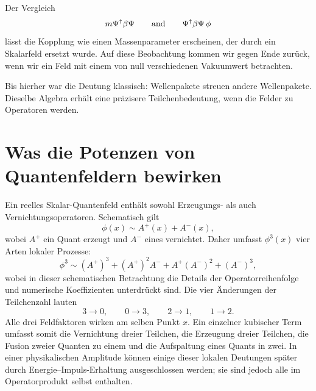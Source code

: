 \begin{classroomqa}
\end{classroomqa}

Der Vergleich
\begin{equation}
m\Psi^\dagger\beta\Psi
\qquad\hbox{and}\qquad
\Psi^\dagger\beta\Psi\,\phi
\end{equation}
lässt die Kopplung wie einen Massenparameter erscheinen, der durch ein Skalarfeld ersetzt wurde. Auf diese Beobachtung kommen wir gegen Ende zurück, wenn wir ein Feld mit einem von null verschiedenen Vakuumwert betrachten.

Bis hierher war die Deutung klassisch: Wellenpakete streuen andere Wellenpakete. Dieselbe Algebra erhält eine präzisere Teilchenbedeutung, wenn die Felder zu Operatoren werden.

\section{Was die Potenzen von Quantenfeldern bewirken}

Ein reelles Skalar-Quantenfeld enthält sowohl Erzeugungs- als auch Vernichtungsoperatoren. Schematisch gilt
\begin{equation}
\phi(x)\sim A^+(x)+A^-(x),
\end{equation}
wobei \(A^+\) ein Quant erzeugt und \(A^-\) eines vernichtet. Daher umfasst \(\phi^3(x)\) vier Arten lokaler Prozesse:
\begin{equation}
\phi^3
\sim
(A^+)^3+(A^+)^2A^-+A^+(A^-)^2+(A^-)^3,
\end{equation}
wobei in dieser schematischen Betrachtung die Details der Operatorreihenfolge und numerische Koeffizienten unterdrückt sind. Die vier Änderungen der Teilchenzahl lauten
\begin{equation}
3\longrightarrow0,
\qquad
0\longrightarrow3,
\qquad
2\longrightarrow1,
\qquad
1\longrightarrow2.
\end{equation}
Alle drei Feldfaktoren wirken am selben Punkt \(x\). Ein einzelner kubischer Term umfasst somit die Vernichtung dreier Teilchen, die Erzeugung dreier Teilchen, die Fusion zweier Quanten zu einem und die Aufspaltung eines Quants in zwei. In einer physikalischen Amplitude können einige dieser lokalen Deutungen später durch Energie--Impuls-Erhaltung ausgeschlossen werden; sie sind jedoch alle im Operatorprodukt selbst enthalten.

